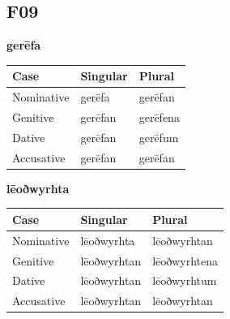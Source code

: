 \subsection*{F09}

\par\begin{minipage}{\linewidth}\raggedright
\textbf{gerēfa}

\par\begingroup
\fontsize{10.5}{13.2}\selectfont
\setlength{\LTleft}{0pt}\setlength{\LTright}{\fill}
\noindent
\begin{tabular}{@{}>{\raggedright\arraybackslash}p{39.46mm}>{\raggedright\arraybackslash}p{39.46mm}>{\raggedright\arraybackslash}p{39.46mm}@{}}
\toprule
\textbf{Case} & \textbf{Singular} & \textbf{Plural} \\
\midrule
Nominative & gerēfa & gerēfan \\
Genitive & gerēfan & gerēfena \\
Dative & gerēfan & gerēfum \\
Accusative & gerēfan & gerēfan \\
\bottomrule
\end{tabular}
\par\endgroup

\textbf{lēoðwyrhta}

\par\begingroup
\fontsize{10.5}{13.2}\selectfont
\setlength{\LTleft}{0pt}\setlength{\LTright}{\fill}
\noindent
\begin{tabular}{@{}>{\raggedright\arraybackslash}p{35.87mm}>{\raggedright\arraybackslash}p{39.46mm}>{\raggedright\arraybackslash}p{43.05mm}@{}}
\toprule
\textbf{Case} & \textbf{Singular} & \textbf{Plural} \\
\midrule
Nominative & lēoðwyrhta & lēoðwyrhtan \\
Genitive & lēoðwyrhtan & lēoðwyrhtena \\
Dative & lēoðwyrhtan & lēoðwyrhtum \\
Accusative & lēoðwyrhtan & lēoðwyrhtan \\
\bottomrule
\end{tabular}
\par\endgroup


\end{minipage}
